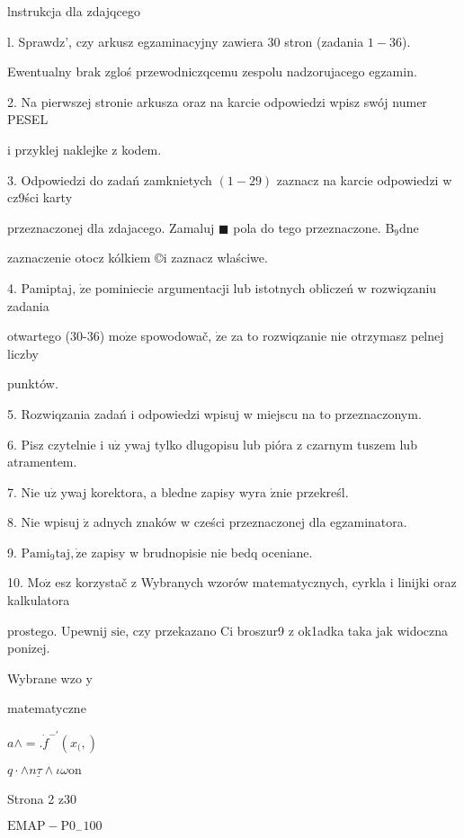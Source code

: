 \documentclass[a4paper,12pt]{article}
\begin{document}
lnstrukcja dla zdajqcego

l. Sprawdz', czy arkusz egzaminacyjny zawiera 30 stron (zadania $1-36$).

Ewentualny brak zgloś przewodniczqcemu zespolu nadzorujacego egzamin.

2. Na pierwszej stronie arkusza oraz na karcie odpowiedzi wpisz swój numer PESEL

i przyklej naklejke z kodem.

3. Odpowiedzi do zadań zamknietych $(1-29)$ zaznacz na karcie odpowiedzi w cz9ści karty

przeznaczonej dla zdajacego. Zamaluj $\blacksquare$ pola do tego przeznaczone. $\mathrm{B}_{9}\mathrm{d}\mathrm{n}\mathrm{e}$

zaznaczenie otocz kólkiem \copyright i zaznacz wlaściwe.

4. Pamiptaj, $\dot{\mathrm{z}}\mathrm{e}$ pominiecie argumentacji lub istotnych obliczeń w rozwiqzaniu zadania

otwartego (30-36) $\mathrm{m}\mathrm{o}\dot{\mathrm{z}}\mathrm{e}$ spowodowač, $\dot{\mathrm{z}}\mathrm{e}$ za to rozwiqzanie nie otrzymasz pelnej liczby

punktów.

5. Rozwiqzania zadań i odpowiedzi wpisuj w miejscu na to przeznaczonym.

6. Pisz czytelnie i $\mathrm{u}\dot{\mathrm{z}}$ ywaj tylko dlugopisu lub pióra z czarnym tuszem lub atramentem.

7. Nie $\mathrm{u}\dot{\mathrm{z}}$ ywaj korektora, a bledne zapisy wyra $\acute{\mathrm{z}}\mathrm{n}\mathrm{i}\mathrm{e}$ przekreśl.

8. Nie wpisuj $\dot{\mathrm{z}}$ adnych znaków w cześci przeznaczonej dla egzaminatora.

9. $\mathrm{P}\mathrm{a}\mathrm{m}\mathrm{i}_{9}\mathrm{t}\mathrm{a}\mathrm{j}, \dot{\mathrm{z}}\mathrm{e}$ zapisy w brudnopisie nie bedq oceniane.

10. $\mathrm{M}\mathrm{o}\dot{\mathrm{z}}$ esz korzystač z Wybranych wzorów matematycznych, cyrkla i linijki oraz kalkulatora

prostego. Upewnij $\mathrm{s}\mathrm{i}\mathrm{e}$, czy przekazano Ci broszur9 z ok1adka taka jak widoczna ponizej.

Wybrane wzo y

matematyczne

$a\wedge=.\dot{f}^{-\prime}(x_{(},)$

$q\cdot\underline{\wedge n\tau\wedge}\iota\omega \mathrm{o}\mathrm{n}$

Strona 2 z30

$\mathrm{E}\mathrm{M}\mathrm{A}\mathrm{P}-\mathrm{P}0_{-}100$
\end{document}
